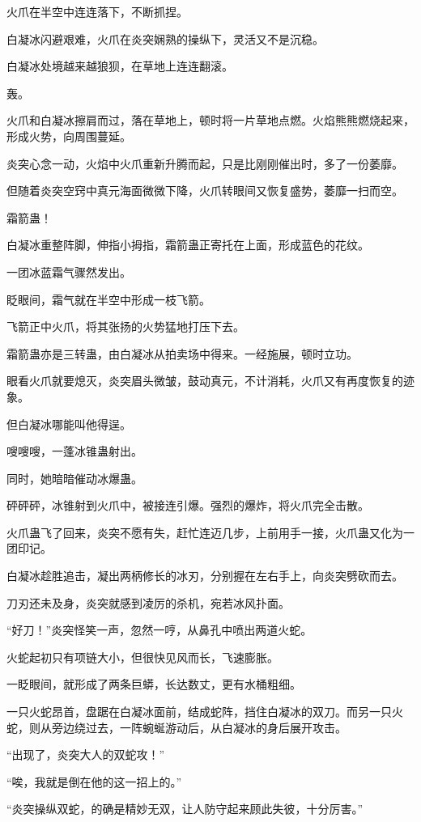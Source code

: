 \begin{this_body}
火爪在半空中连连落下，不断抓捏。

白凝冰闪避艰难，火爪在炎突娴熟的操纵下，灵活又不是沉稳。

白凝冰处境越来越狼狈，在草地上连连翻滚。

轰。

火爪和白凝冰擦肩而过，落在草地上，顿时将一片草地点燃。火焰熊熊燃烧起来，形成火势，向周围蔓延。

炎突心念一动，火焰中火爪重新升腾而起，只是比刚刚催出时，多了一份萎靡。

但随着炎突空窍中真元海面微微下降，火爪转眼间又恢复盛势，萎靡一扫而空。

霜箭蛊！

白凝冰重整阵脚，伸指小拇指，霜箭蛊正寄托在上面，形成蓝色的花纹。

一团冰蓝霜气骤然发出。

眨眼间，霜气就在半空中形成一枝飞箭。

飞箭正中火爪，将其张扬的火势猛地打压下去。

霜箭蛊亦是三转蛊，由白凝冰从拍卖场中得来。一经施展，顿时立功。

眼看火爪就要熄灭，炎突眉头微皱，鼓动真元，不计消耗，火爪又有再度恢复的迹象。

但白凝冰哪能叫他得逞。

嗖嗖嗖，一蓬冰锥蛊射出。

同时，她暗暗催动冰爆蛊。

砰砰砰，冰锥射到火爪中，被接连引爆。强烈的爆炸，将火爪完全击散。

火爪蛊飞了回来，炎突不愿有失，赶忙连迈几步，上前用手一接，火爪蛊又化为一团印记。

白凝冰趁胜追击，凝出两柄修长的冰刃，分别握在左右手上，向炎突劈砍而去。

刀刃还未及身，炎突就感到凌厉的杀机，宛若冰风扑面。

“好刀！”炎突怪笑一声，忽然一哼，从鼻孔中喷出两道火蛇。

火蛇起初只有项链大小，但很快见风而长，飞速膨胀。

一眨眼间，就形成了两条巨蟒，长达数丈，更有水桶粗细。

一只火蛇昂首，盘踞在白凝冰面前，结成蛇阵，挡住白凝冰的双刀。而另一只火蛇，则从旁边绕过去，一阵蜿蜒游动后，从白凝冰的身后展开攻击。

“出现了，炎突大人的双蛇攻！”

“唉，我就是倒在他的这一招上的。”

“炎突操纵双蛇，的确是精妙无双，让人防守起来顾此失彼，十分厉害。”


\end{this_body}
